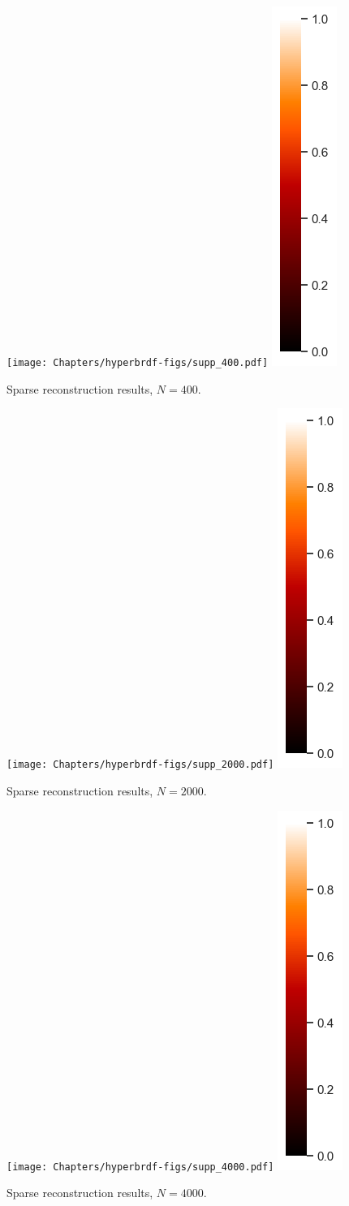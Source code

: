 \begin{figure}
  \centering

  {\texttt{[image: Chapters/hyperbrdf-figs/supp\_400.pdf]}}
  {\includegraphics[width=0.02\linewidth]{Chapters/hyperbrdf-figs/vbar.png}}
   \caption{Sparse reconstruction results, $N = 400$.}
   \label{fig:400}
\end{figure}

\begin{figure}
  \centering

  {\texttt{[image: Chapters/hyperbrdf-figs/supp\_2000.pdf]}}
  {\includegraphics[width=0.02\linewidth]{Chapters/hyperbrdf-figs/vbar.png}}
   \caption{Sparse reconstruction results, $N = 2000$.}
   \label{fig:2000}
\end{figure}

\begin{figure}
  \centering

  {\texttt{[image: Chapters/hyperbrdf-figs/supp\_4000.pdf]}}
  {\includegraphics[width=0.02\linewidth]{Chapters/hyperbrdf-figs/vbar.png}}
   \caption{Sparse reconstruction results, $N = 4000$.}
   \label{fig:4000}
\end{figure}


